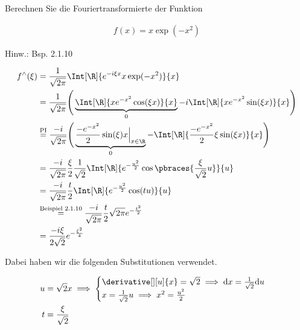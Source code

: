 
\begin{exercise}

Berechnen Sie die Fouriertransformierte der Funktion

\begin{align*}
    f(x)
    =
    x \exp(-x^2)
\end{align*}

Hinw.:
Bsp. 2.1.10

\end{exercise}


\begin{solution}

\begin{align*}
    f^\wedge(\xi)
    & =
    \frac{1}{\sqrt{2 \pi}}
    \Int[\R]
    {
        e^{-i \xi x}
        x \exp(-x^2)
    }{x} \\
    & =
    \frac{1}{\sqrt{2 \pi}}
    \Bigg (
        \underbrace
        {
            \Int[\R]
            {
                x e^{-x^2}
                \cos(\xi x)
            }{x}    
        }_0
        -
        i
        \Int[\R]
        {
            x e^{-x^2}
            \sin(\xi x)
        }{x}
    \Bigg ) \\
    & \stackrel
    {
        \mathrm{PI}
    }{=}
    \frac{-i}{\sqrt{2 \pi}}
    \Bigg (
        \underbrace
        {
            \frac{-e^{-x^2}}{2}
            \sin(\xi) x
            \Big |_{x \in \R}    
        }_0
        -
        \Int[\R]
        {
            \frac{-e^{-x^2}}{2}
            \xi \sin(\xi x)
        }{x}
    \Bigg ) \\
    & =
    \frac{-i}{\sqrt{2 \pi}}
    \frac{\xi}{2}
    \frac{1}{\sqrt 2}
    \Int[\R]
    {
        e^{-\frac{u^2}{2}}
        \cos \pbraces{\frac{\xi}{\sqrt 2} u}
    }{u} \\
    & =
    \frac{-i}{\sqrt{2 \pi}}
    \frac{t}{2}
    \Int[\R]
    {
        e^{-\frac{u^2}{2}}
        \cos(t u)
    }{u} \\
    & \stackrel
    {
        \text{Beispiel 2.1.10}
    }{=}
    \frac{-i}{\sqrt{2 \pi}}
    \frac{t}{2}
    \sqrt{2 \pi}
    e^{-\frac{t^2}{2}} \\
    & =
    \frac{-i \xi}{2 \sqrt 2}
    e^{-\frac{\xi^2}{4}}
\end{align*}

Dabei haben wir die folgenden Substitutionen verwendet.

\begin{align*}
    u & = \sqrt 2 x
    \implies
    \begin{cases}
        \derivative[][u]{x} = \sqrt 2 \implies \mathrm{d} x = \frac{1}{\sqrt 2} \mathrm{d} u \\
        x = \frac{1}{\sqrt 2} u \implies x^2 = \frac{u^2}{2}
    \end{cases} \\
    t & = \frac{\xi}{\sqrt 2}
\end{align*}

\end{solution}

